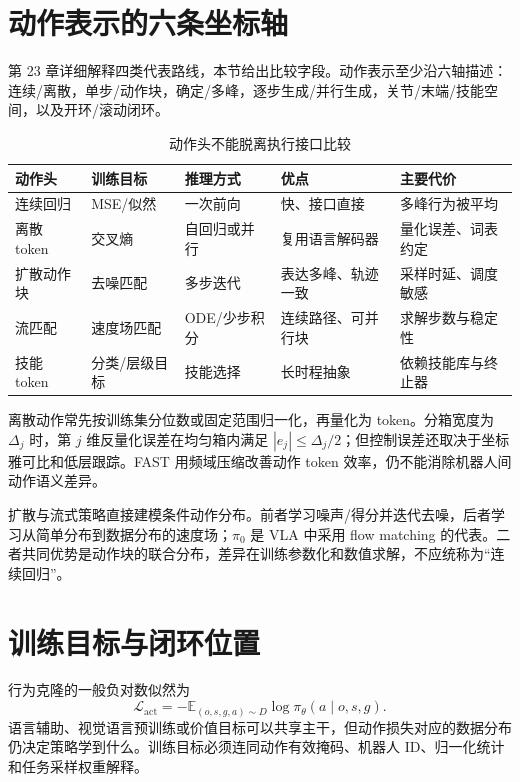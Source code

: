 \section{动作表示的六条坐标轴}

第 23 章详细解释四类代表路线，本节给出比较字段。动作表示至少沿六轴描述：连续/离散，单步/动作块，确定/多峰，逐步生成/并行生成，关节/末端/技能空间，以及开环/滚动闭环。

\begin{table}[H]
\centering
\caption{动作头不能脱离执行接口比较}
\label{tab:vla-action-heads}
\begin{tabularx}{\textwidth}{p{}YYYY}
\toprule
动作头 & 训练目标 & 推理方式 & 优点 & 主要代价 \\
\midrule
连续回归 & MSE/似然 & 一次前向 & 快、接口直接 & 多峰行为被平均 \\
离散 token & 交叉熵 & 自回归或并行 & 复用语言解码器 & 量化误差、词表约定 \\
扩散动作块 & 去噪匹配 & 多步迭代 & 表达多峰、轨迹一致 & 采样时延、调度敏感 \\
流匹配 & 速度场匹配 & ODE/少步积分 & 连续路径、可并行块 & 求解步数与稳定性 \\
技能 token & 分类/层级目标 & 技能选择 & 长时程抽象 & 依赖技能库与终止器 \\
\bottomrule
\end{tabularx}
\end{table}

离散动作常先按训练集分位数或固定范围归一化，再量化为 token。分箱宽度为 $\Delta_j$ 时，第 $j$ 维反量化误差在均匀箱内满足 $|e_j|\leq\Delta_j/2$；但控制误差还取决于坐标雅可比和低层跟踪。FAST 用频域压缩改善动作 token 效率\cite{pertsch2025fast}，仍不能消除机器人间动作语义差异。

扩散与流式策略直接建模条件动作分布。前者学习噪声/得分并迭代去噪，后者学习从简单分布到数据分布的速度场；$\pi_0$ 是 VLA 中采用 flow matching 的代表\cite{black2024pi0}。二者共同优势是动作块的联合分布，差异在训练参数化和数值求解，不应统称为“连续回归”。

\section{训练目标与闭环位置}

行为克隆的一般负对数似然为
\begin{equation}
\mathcal L_{\mathrm{act}}=-\mathbb E_{(o,s,g,a)\sim D}
\log \pi_\theta(a\mid o,s,g).
\end{equation}
语言辅助、视觉语言预训练或价值目标可以共享主干，但动作损失对应的数据分布仍决定策略学到什么。训练目标必须连同动作有效掩码、机器人 ID、归一化统计和任务采样权重解释。

